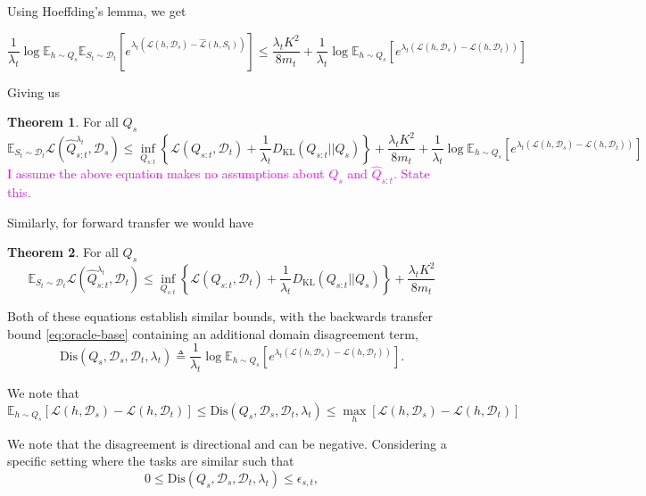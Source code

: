 \documentclass[letterpaper]{article}
\theoremstyle{definition}
\newtheorem{theorem}{Theorem}
\newcommand{\RM}[1]{{\textcolor{magenta}{#1}}}
\begin{document}
Using Hoeffding's lemma, we get

$$\frac{1}{\lambda_t}\log\mathbb{E}_{h\sim Q_s}\mathbb{E}_{S_t\sim \mathcal{D}_t}\left [e^{\lambda_t(\mathcal{L}(h,\mathcal{D}_s)-\hat{\mathcal{L}}(h,S_t))} \right ] \leq \frac{\lambda_t K^2}{8m_t}+\frac{1}{\lambda_t}\log\mathbb{E}_{h\sim Q_s}\left [e^{\lambda_t(\mathcal{L}(h,\mathcal{D}_s)-\mathcal{L}(h,\mathcal{D}_t))} \right ]$$

Giving us 
\begin{theorem}
For all $Q_s$ 
\begin{equation} \label{eq:oracle-base}
\mathbb{E}_{S_t\sim \mathcal{D}_t}\mathcal{L}( \hat{Q}^{\lambda_t}_{s:t},\mathcal{D}_s)\leq \inf_{Q_{s:t}}\left \{ \mathcal{L}(Q_{s:t},\mathcal{D}_t) + \frac{1}{\lambda_t}D_{\mathrm{KL}}(Q_{s:t}||Q_{s}) \right \}+\frac{\lambda_t K^2}{8m_t}+\frac{1}{\lambda_t}\log\mathbb{E}_{h\sim Q_s}\left [e^{\lambda_t(\mathcal{L}(h,\mathcal{D}_s)-\mathcal{L}(h,\mathcal{D}_t))} \right ]
\end{equation}
\RM{I assume the above equation makes no assumptions about $Q_s$ and $\hat Q_{s:t}$. State this.}
\end{theorem}

Similarly, for forward transfer we would have

\begin{theorem} \label{thm:forget-dis}
For all $Q_s$ 
\begin{equation}
\mathbb{E}_{S_t\sim \mathcal{D}_t}\mathcal{L}(\hat{Q}^{\lambda_t}_{s:t},\mathcal{D}_t)\leq \inf_{Q_{s:t}}\left \{ \mathcal{L}(Q_{s:t},\mathcal{D}_t) + \frac{1}{\lambda_t}D_{\mathrm{KL}}(Q_{s:t}||Q_{s}) \right \}+\frac{\lambda_t K^2}{8m_t}
\end{equation}
\end{theorem}

Both of these equations establish similar bounds, with the backwards transfer bound \eqref{eq:oracle-base} containing an additional domain disagreement term, $$\mathrm{Dis}(Q_s,\mathcal{D}_s, \mathcal{D}_t, \lambda_t )\triangleq\frac{1}{\lambda_t}\log\mathbb{E}_{h\sim Q_s}\left [e^{\lambda_t(\mathcal{L}(h,\mathcal{D}_s)-\mathcal{L}(h,\mathcal{D}_t))} \right ].$$

We note that 
$$\mathbb{E}_{h\sim Q_s}\left [\mathcal{L}(h,\mathcal{D}_s)-\mathcal{L}(h,\mathcal{D}_t) \right ] \leq \mathrm{Dis}(Q_s,\mathcal{D}_s, \mathcal{D}_t, \lambda_t )\leq \max_{h}\left [\mathcal{L}(h,\mathcal{D}_s)-\mathcal{L}(h,\mathcal{D}_t) \right ]$$

We note that the disagreement is directional and can be negative. Considering a specific setting where the tasks are similar such that 
\begin{equation} \label{eq:assume-similar}
    0\leq \mathrm{Dis}(Q_s,\mathcal{D}_s, \mathcal{D}_t, \lambda_t ) \leq \epsilon_{s,t},
\end{equation}
\end{document}
